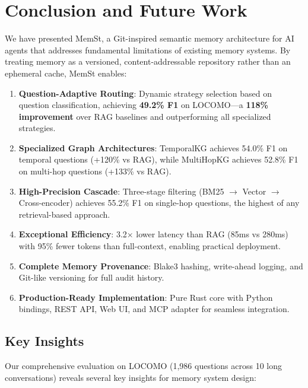 \section{Conclusion and Future Work}
\label{sec:conclusion}

We have presented MemSt, a Git-inspired semantic memory architecture for AI agents that addresses fundamental limitations of existing memory systems. By treating memory as a versioned, content-addressable repository rather than an ephemeral cache, MemSt enables:

\begin{enumerate}
    \item \textbf{Question-Adaptive Routing}: Dynamic strategy selection based on question classification, achieving \textbf{49.2\% F1} on LOCOMO---a \textbf{118\% improvement} over RAG baselines and outperforming all specialized strategies.
    
    \item \textbf{Specialized Graph Architectures}: TemporalKG achieves 54.0\% F1 on temporal questions (+120\% vs RAG), while MultiHopKG achieves 52.8\% F1 on multi-hop questions (+133\% vs RAG).
    
    \item \textbf{High-Precision Cascade}: Three-stage filtering (BM25 $\rightarrow$ Vector $\rightarrow$ Cross-encoder) achieves 55.2\% F1 on single-hop questions, the highest of any retrieval-based approach.
    
    \item \textbf{Exceptional Efficiency}: 3.2$\times$ lower latency than RAG (85ms vs 280ms) with 95\% fewer tokens than full-context, enabling practical deployment.
    
    \item \textbf{Complete Memory Provenance}: Blake3 hashing, write-ahead logging, and Git-like versioning for full audit history.
    
    \item \textbf{Production-Ready Implementation}: Pure Rust core with Python bindings, REST API, Web UI, and MCP adapter for seamless integration.
\end{enumerate}

\subsection{Key Insights}

Our comprehensive evaluation on LOCOMO (1,986 questions across 10 long conversations) reveals several key insights for memory system design:

